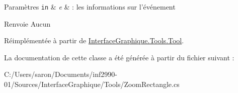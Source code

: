 \begin{DoxyParams}[1]{Paramètres}
\mbox{\tt in}  & {\em e} & \-: les informations sur l'événement\\
\hline
\end{DoxyParams}
\begin{DoxyReturn}{Renvoie}
Aucun 
\end{DoxyReturn}


Réimplémentée à partir de \hyperlink{class_interface_graphique_1_1_tools_1_1_tool_a51c4828f7d24c599b5748b9b3f64d39e}{Interface\-Graphique.\-Tools.\-Tool}.



La documentation de cette classe a été générée à partir du fichier suivant \-:\begin{DoxyCompactItemize}
\item 
C\-:/\-Users/saron/\-Documents/inf2990-\/01/\-Sources/\-Interface\-Graphique/\-Tools/Zoom\-Rectangle.\-cs\end{DoxyCompactItemize}
